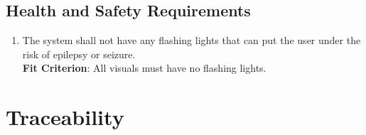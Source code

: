 \documentclass[12pt, titlepage]{article}
\begin{document}
\subsection{Health and Safety Requirements}
\begin{enumerate}[label=NFR.\arabic*, resume]
    \item The system shall not have any flashing lights that can put the user under the risk of epilepsy or seizure. \label{NFR.13}
    \\\textbf{Fit Criterion}: All visuals must have no flashing lights.
\end{enumerate}


\section{Traceability}
\end{document}
